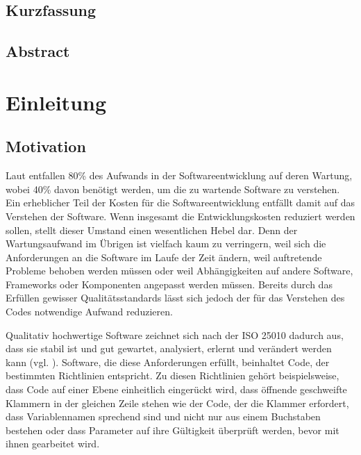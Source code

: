 \documentclass[
	oneside,  %
	ngerman, 
	final, 
	11pt, 
	a4paper, 
	1.1headlines, 
	headinclude=false, 
	footinclude=false, 
	mpinclude=false, 
	pagesize, 
	onecolumn, 
	titlepage, 
	parskip=half, 
	headsepline, 
	chapterprefix=false, 
	version=first, 
	listof=totoc, 
	bibliography=totoc, 
	toc=graduated, 
	fleqn
]{scrbook}
\begin{document}
\section*{\thispagestyle{empty}Kurzfassung}
\lipsum[1-2]

\newpage{}

\section*{\thispagestyle{empty}Abstract}		
\lipsum[1-2]

\newpage{}

\setcounter{page}{1}
\tableofcontents
		
\newpage{}
		
\setcounter{page}{1} 



\chapter{Einleitung}
\label{Einleitung}

		
\section{Motivation}
\label{Motivation}
Laut \cite{Balzert2009} entfallen 80\% des Aufwands in der Softwareentwicklung auf deren Wartung, wobei 40\% davon benötigt werden, um die zu wartende Software zu verstehen.
Ein erheblicher Teil der Kosten für die Softwareentwicklung entfällt damit auf das Verstehen der Software.
Wenn insgesamt die Entwicklungskosten reduziert werden sollen, stellt dieser Umstand einen wesentlichen Hebel dar.
Denn der Wartungsaufwand im Übrigen ist vielfach kaum zu verringern, weil sich die Anforderungen an die Software im Laufe der Zeit ändern, weil auftretende Probleme behoben werden müssen oder weil Abhängigkeiten auf andere Software, Frameworks oder Komponenten angepasst werden müssen.
Bereits durch das Erfüllen gewisser Qualitätsstandards lässt sich jedoch der für das Verstehen des Codes notwendige Aufwand reduzieren.

Qualitativ hochwertige Software zeichnet sich nach der \acf{ISO} 25010 dadurch aus, dass sie stabil ist und gut gewartet, analysiert, erlernt und verändert werden kann (vgl. \cite{ISO-25010}).
Software, die diese Anforderungen erfüllt, beinhaltet Code, der bestimmten Richtlinien entspricht.
Zu diesen Richtlinien gehört beispielsweise, dass Code auf einer Ebene einheitlich eingerückt wird, dass öffnende geschweifte Klammern in der gleichen Zeile stehen wie der Code, der die Klammer erfordert, dass Variablennamen sprechend sind und nicht nur aus einem Buchstaben bestehen oder dass Parameter auf ihre Gültigkeit überprüft werden, bevor mit ihnen gearbeitet wird.
\end{document}

